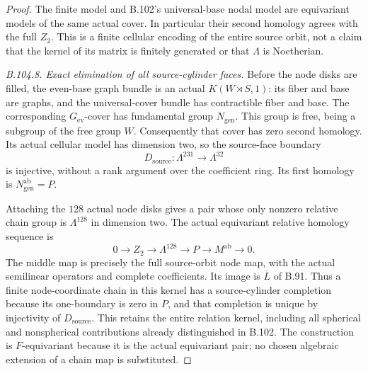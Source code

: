 \begin{proof}
The finite model and B.102's universal-base nodal model are
equivariant models of the same actual cover. In particular their
second homology agrees with the full $Z_2$. This is a finite
cellular encoding of the entire source orbit, not a claim that
the kernel of its matrix is finitely generated or that $\Lambda$
is Noetherian.

\emph{B.104.8. Exact elimination of all source-cylinder faces.}
Before the node disks are filled, the even-base graph bundle is
an actual $K(W\rtimes S,1)$: its fiber and base are graphs, and
the universal-cover bundle has contractible fiber and base.
The corresponding $G_{\mathrm{ev}}$-cover has fundamental group
$N_{\mathrm{gen}}$. This group is free, being a subgroup of the
free group $W$. Consequently that cover has zero second homology.
Its actual cellular model has dimension two, so the source-face
boundary
\[
 D_{\mathrm{source}}:\Lambda^{231}\longrightarrow\Lambda^{32}
\]
is injective, without a rank argument over the coefficient ring.
Its first homology is $N_{\mathrm{gen}}^{\mathrm{ab}}=P$.

Attaching the $128$ actual node disks gives a pair whose only
nonzero relative chain group is $\Lambda^{128}$ in dimension
two. The actual equivariant relative homology sequence is
\begin{equation}\label{eq:B104-source-elimination}
 0\longrightarrow Z_2\longrightarrow\Lambda^{128}
       \longrightarrow P\longrightarrow M^{\mathrm{ab}}
       \longrightarrow0.
\end{equation}
The middle map is precisely the full source-orbit node map, with
the actual semilinear operators and complete coefficients. Its
image is $\overline L$ of B.91. Thus a finite node-coordinate
chain in this kernel has a source-cylinder completion because
its one-boundary is zero in $P$, and that completion is unique
by injectivity of $D_{\mathrm{source}}$. This retains the entire
relation kernel, including all spherical and nonspherical
contributions already distinguished in B.102. The construction
is $F$-equivariant because it is the actual equivariant pair;
no chosen algebraic extension of a chain map is substituted.


\end{proof}

